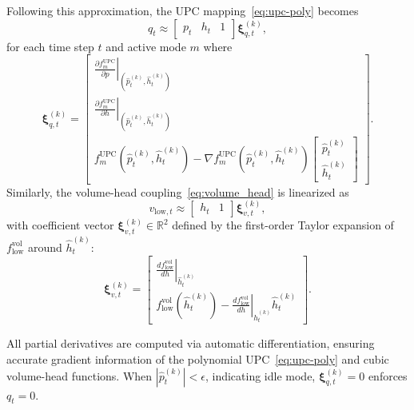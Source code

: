 \documentclass[journal]{IEEEtran}
\begin{document}
Following this approximation, the UPC mapping~\eqref{eq:upc-poly} becomes
\begin{equation}
q_t \approx \begin{bmatrix} p_t & h_t & 1 \end{bmatrix} \boldsymbol{\xi}_{q,t}^{(k)},
\label{eq:taylor_flow}
\end{equation}
for each time step $t$ and active mode $m$ where
\begin{equation}
\boldsymbol{\xi}_{q,t}^{(k)} = \begin{bmatrix}
\left. \frac{\partial f_m^{\text{UPC}}}{\partial p} \right|_{(\hat{p}_t^{(k)}, \hat{h}_t^{(k)})} \\[4pt]
\left. \frac{\partial f_m^{\text{UPC}}}{\partial h} \right|_{(\hat{p}_t^{(k)}, \hat{h}_t^{(k)})} \\[4pt]
f_m^{\text{UPC}}(\hat{p}_t^{(k)}, \hat{h}_t^{(k)}) - \nabla f_m^{\text{UPC}}(\hat{p}_t^{(k)}, \hat{h}_t^{(k)}) \begin{bmatrix} \hat{p}_t^{(k)} \\ \hat{h}_t^{(k)} \end{bmatrix}
\end{bmatrix}.
\label{eq:xi_flow}
\end{equation}
Similarly, the volume-head coupling~\eqref{eq:volume_head} is linearized as
\begin{equation}
v_{\text{low},t} \approx \begin{bmatrix} h_t & 1 \end{bmatrix} \boldsymbol{\xi}_{v,t}^{(k)},
\label{eq:taylor_volume}
\end{equation}
with coefficient vector $\boldsymbol{\xi}_{v,t}^{(k)} \in \mathbb{R}^2$ defined by the first-order Taylor expansion of $f_{\text{low}}^{\text{vol}}$ around $\hat{h}_t^{(k)}$:
\begin{equation}
\boldsymbol{\xi}_{v,t}^{(k)} = \begin{bmatrix}
\left. \frac{d f_{\text{low}}^{\text{vol}}}{d h} \right|_{\hat{h}_t^{(k)}} \\[4pt]
f_{\text{low}}^{\text{vol}}(\hat{h}_t^{(k)}) - \left. \frac{d f_{\text{low}}^{\text{vol}}}{d h} \right|_{\hat{h}_t^{(k)}} \hat{h}_t^{(k)}
\end{bmatrix}.
\label{eq:xi_volume}
\end{equation}

All partial derivatives are computed via automatic differentiation, ensuring accurate gradient information of the polynomial UPC~\eqref{eq:upc-poly} and cubic volume-head functions. When $|\hat{p}_t^{(k)}| < \epsilon$, indicating idle mode, $\boldsymbol{\xi}_{q,t}^{(k)}=0$ enforces $q_t = 0$. 
\end{document}
